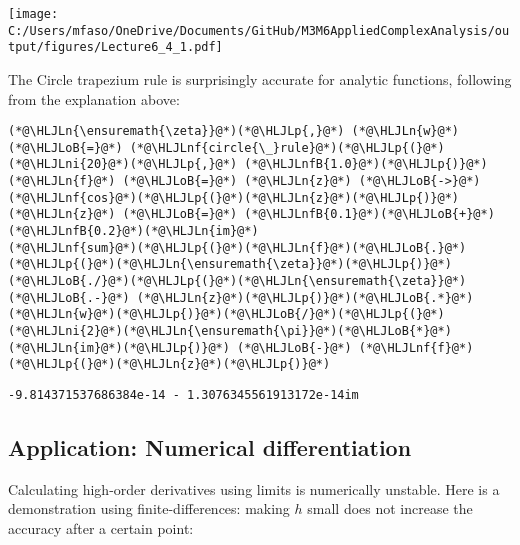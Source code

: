 \documentclass[12pt,a4paper]{article}
\newcommand{\HLJLn}[1]{#1}
\newcommand{\HLJLnf}[1]{\textcolor[RGB]{66,102,213}{#1}}
\newcommand{\HLJLnfB}[1]{\textcolor[RGB]{59,151,46}{#1}}
\newcommand{\HLJLni}[1]{\textcolor[RGB]{59,151,46}{#1}}
\newcommand{\HLJLoB}[1]{\textcolor[RGB]{102,102,102}{\textbf{#1}}}
\newcommand{\HLJLp}[1]{#1}
\begin{document}
\texttt{[image: C:/Users/mfaso/OneDrive/Documents/GitHub/M3M6AppliedComplexAnalysis/output/figures/Lecture6\_4\_1.pdf]}

The Circle trapezium rule is surprisingly accurate for analytic functions, following from the explanation above:


\begin{lstlisting}
(*@\HLJLn{\ensuremath{\zeta}}@*)(*@\HLJLp{,}@*) (*@\HLJLn{w}@*) (*@\HLJLoB{=}@*) (*@\HLJLnf{circle{\_}rule}@*)(*@\HLJLp{(}@*)(*@\HLJLni{20}@*)(*@\HLJLp{,}@*) (*@\HLJLnfB{1.0}@*)(*@\HLJLp{)}@*)
(*@\HLJLn{f}@*) (*@\HLJLoB{=}@*) (*@\HLJLn{z}@*) (*@\HLJLoB{->}@*) (*@\HLJLnf{cos}@*)(*@\HLJLp{(}@*)(*@\HLJLn{z}@*)(*@\HLJLp{)}@*)
(*@\HLJLn{z}@*) (*@\HLJLoB{=}@*) (*@\HLJLnfB{0.1}@*)(*@\HLJLoB{+}@*)(*@\HLJLnfB{0.2}@*)(*@\HLJLn{im}@*)
(*@\HLJLnf{sum}@*)(*@\HLJLp{(}@*)(*@\HLJLn{f}@*)(*@\HLJLoB{.}@*)(*@\HLJLp{(}@*)(*@\HLJLn{\ensuremath{\zeta}}@*)(*@\HLJLp{)}@*)(*@\HLJLoB{./}@*)(*@\HLJLp{(}@*)(*@\HLJLn{\ensuremath{\zeta}}@*) (*@\HLJLoB{.-}@*) (*@\HLJLn{z}@*)(*@\HLJLp{)}@*)(*@\HLJLoB{.*}@*)(*@\HLJLn{w}@*)(*@\HLJLp{)}@*)(*@\HLJLoB{/}@*)(*@\HLJLp{(}@*)(*@\HLJLni{2}@*)(*@\HLJLn{\ensuremath{\pi}}@*)(*@\HLJLoB{*}@*)(*@\HLJLn{im}@*)(*@\HLJLp{)}@*) (*@\HLJLoB{-}@*) (*@\HLJLnf{f}@*)(*@\HLJLp{(}@*)(*@\HLJLn{z}@*)(*@\HLJLp{)}@*)
\end{lstlisting}

\begin{lstlisting}
-9.814371537686384e-14 - 1.3076345561913172e-14im
\end{lstlisting}


\subsection{Application: Numerical differentiation}
Calculating high-order derivatives using limits is numerically unstable. Here is a demonstration using finite-differences: making $h$ small does not increase the accuracy after a certain point:
\end{document}
